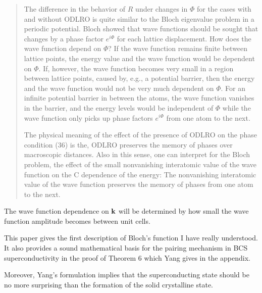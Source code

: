 \documentclass{article}
\def\k{{\bf k}}
\begin{document}
\begin{quote}
  The difference in the behavior of $R$ under changes in $\Phi$ for the cases 
with and without ODLRO is quite similar to the Bloch eigenvalue problem
in a periodic potential. Bloch showed that wave functions should be sought 
that changes by a phase factor $e^{i\Phi}$ for each lattice displacement. How does the 
wave function depend on $\Phi$? If the wave function remains finite between lattice points, 
the energy value and the wave function would be dependent on $\Phi$. If, however, 
the wave function becomes very small in a region between lattice points, 
caused by, e.g., a potential barrier, then the energy and the wave function 
would not be very much dependent on $\Phi$. For an infinite potential barrier in 
between the atoms, the wave function vanishes in the barrier, and the energy 
levels would be independent of $\Phi$ while the
wave function only picks up phase factors $e^{i\Phi}$ from one atom to the next.

  The physical meaning of the effect of the presence of ODLRO on the 
phase condition (36) is the, ODLRO preserves the memory of phases over 
macroscopic distances. Also in this sense, one can interpret for the 
Bloch problem, the effect of the small nonvanishing interatomic 
value of the wave function on the C dependence of the energy: 
The nonvanishing interatomic value of the wave function preserves the 
memory of phases from one atom to the next.

\end{quote}

The wave function dependence on $\k$ will be determined by how small 
the wave function amplitude becomes between unit cells.

This paper gives the first description of Bloch's function I have really understood. 
It also provides a sound mathematical basis for the pairing mechanism in BCS
superconductivity in the proof of Theorem 6 which Yang gives in the appendix.

Moreover, Yang's formulation implies that the superconducting state
should be no more surprising than the formation of the solid crystalline state.
\end{document}
